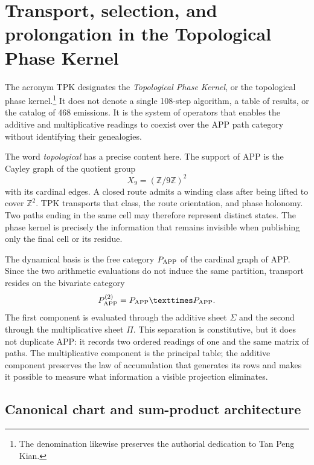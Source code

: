 \chapter{Transport, selection, and prolongation in the Topological Phase Kernel}
\label{sec:arquitectura-tpk}

The acronym TPK designates the \emph{Topological Phase Kernel}, or the topological phase
kernel.\footnote{The denomination likewise preserves the
authorial dedication to Tan Peng Kian.} It does not denote a single 108-step algorithm, a table of
results, or the catalog of 468 emissions. It is the system of
operators that enables the additive and multiplicative readings to coexist
over the APP path category without identifying their
genealogies.

The word \emph{topological} has a precise content here. The support
of APP is the Cayley graph of the quotient group
\[
 X_9=(\mathbb Z/9\mathbb Z)^2
\]
with its cardinal edges. A closed route admits a winding class
after being lifted to cover \(\mathbb Z^2\). TPK transports that class,
the route orientation, and phase holonomy. Two paths ending
in the same cell may therefore represent distinct states. The phase kernel
is precisely the information that remains invisible when publishing
only the final cell or its residue.

The dynamical basis is the free category \(\mathsf P_{\rm APP}\) of the
cardinal graph of APP\@. Since the two arithmetic evaluations do not induce the
same partition, transport resides on the bivariate category
\[
 \mathsf P_{\rm APP}^{(2)}
 =\mathsf P_{\rm APP}\times\mathsf P_{\rm APP}.
\]
The first component is evaluated through the additive sheet \(\Sigma\) and the
second through the multiplicative sheet \(\Pi\). This separation is
constitutive, but it does not duplicate APP: it records two ordered readings of one
and the same matrix of paths. The multiplicative component is the principal table;
the additive component preserves the law of accumulation that generates its rows and makes it possible
to measure what information a visible projection eliminates.

\ifdefined\HMTTPKRepeatAPP
\section{Canonical chart and sum-product architecture}

